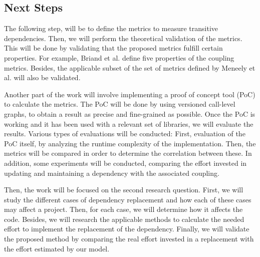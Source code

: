 \documentclass[a4paper]{article}
\begin{document}
\subsection{Next Steps}
The following step, will be to define the metrics to measure transitive dependencies. Then, we will perform the theoretical validation of the metrics. This will be done by validating that the proposed metrics fulfill certain properties. For example, Briand et al. \cite{briand1999unified} define five properties of the coupling metrics. Besides, the applicable subset of the set of metrics defined by Meneely et al. \cite{meneely2013validating} will also be validated.

Another part of the work will involve implementing a proof of concept tool (PoC) to calculate the metrics. The PoC will be done by using versioned call-level graphs, to obtain a result as precise and fine-grained as possible.
Once the PoC is working and it has been used with a relevant set of libraries, we will evaluate the results. Various types of evaluations will be conducted: First, evaluation of the PoC itself, by analyzing the runtime complexity of the implementation. Then, the metrics will be compared in order to determine the correlation between these. In addition, some experiments will be conducted, comparing the effort invested in updating and maintaining a dependency with the associated coupling.

Then, the work will be focused on the second research question. First, we will study the different cases of dependency replacement and how each of these cases may affect a project. Then, for each case, we will determine how it affects the code. Besides, we will research the applicable methods to calculate the needed effort to implement the replacement of the dependency. Finally, we will validate the proposed method by comparing the real effort invested in a replacement with the effort estimated by our model.



\end{document}
